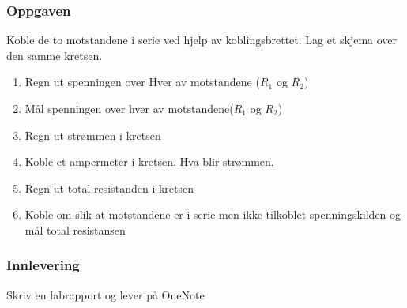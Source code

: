 \subsubsection*{Oppgaven}

Koble de to motstandene i serie ved hjelp av koblingsbrettet. Lag et skjema over den samme kretsen. 
\begin{enumerate}
	
		\item Regn ut spenningen over Hver av motstandene ($R_1$ og $R_2$)
		\item Mål spenningen over hver av motstandene($R_1$ og $R_2$)
		\item Regn ut strømmen i kretsen
		\item Koble et ampermeter i kretsen. Hva blir strømmen.
		\item Regn ut total resistanden i kretsen 
		\item Koble om slik at motstandene er i serie men ikke tilkoblet spenningskilden og mål total resistansen
\end{enumerate}

\subsubsection*{Innlevering}

Skriv en labrapport og lever på OneNote\\
\vskip 5pt 



